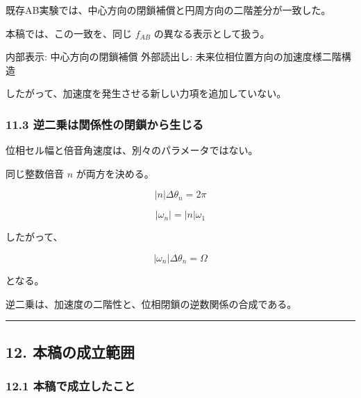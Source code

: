 \documentclass[
  10pt,
  a4paper,
]{ltjsarticle}
\newenvironment{Shaded}{}{}
\newcommand{\NormalTok}[1]{#1}
\begin{document}
既存AB実験では、中心方向の閉鎖補償と円周方向の二階差分が一致した。

本稿では、この一致を、同じ \(f_{AB}\) の異なる表示として扱う。

\begin{Shaded}
\begin{Highlighting}[]
\NormalTok{内部表示: 中心方向の閉鎖補償}
\NormalTok{外部読出し: 未来位相位置方向の加速度様二階構造}
\end{Highlighting}
\end{Shaded}

したがって、加速度を発生させる新しい力項を追加していない。

\subsubsection{11.3
逆二乗は関係性の閉鎖から生じる}\label{ux9006ux4e8cux4e57ux306fux95a2ux4fc2ux6027ux306eux9589ux9396ux304bux3089ux751fux3058ux308b}

位相セル幅と倍音角速度は、別々のパラメータではない。

同じ整数倍音 \(n\) が両方を決める。

\[
|n|\Delta\theta_n=2\pi
\]

\[
|\omega_n|=|n|\omega_1
\]

したがって、

\[
|\omega_n|\Delta\theta_n=\Omega
\]

となる。

逆二乗は、加速度の二階性と、位相閉鎖の逆数関係の合成である。

\begin{center}\rule{0.5\linewidth}{0.5pt}\end{center}

\subsection{12.
本稿の成立範囲}\label{ux672cux7a3fux306eux6210ux7acbux7bc4ux56f2}

\subsubsection{12.1
本稿で成立したこと}\label{ux672cux7a3fux3067ux6210ux7acbux3057ux305fux3053ux3068}
\end{document}
